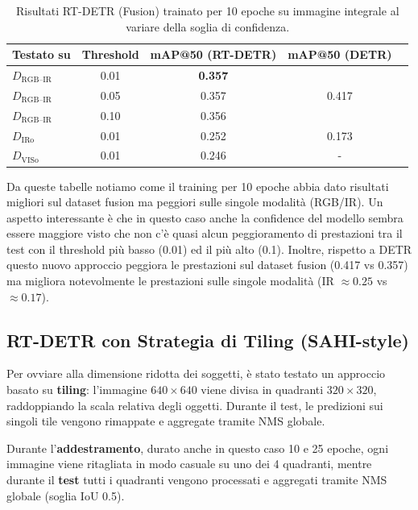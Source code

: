 \documentclass[a4paper,11pt]{article}
\begin{document}
\begin{table}[h]
\centering
\caption{Risultati RT-DETR (Fusion) trainato per 10 epoche su immagine integrale al variare della soglia di confidenza.}
\label{tab:rtdetr_base_10}
\begin{tabular}{lcccc}
\toprule
Testato su & Threshold & mAP@50 (RT-DETR) & mAP@50 (DETR) \\
\midrule
$D_{\text{RGB--IR}}$ & 0.01 & \textbf{0.357} & \multirow{3}{*}{0.417} \\
$D_{\text{RGB--IR}}$ & 0.05 & 0.357 & \\
$D_{\text{RGB--IR}}$ & 0.10 & 0.356 & \\
\midrule
$D_{\text{IRo}}$ & 0.01 & 0.252 & 0.173 \\
$D_{\text{VISo}}$ & 0.01 & 0.246 & - \\
\bottomrule
\end{tabular}
\end{table}

Da queste tabelle notiamo come il training per 10 epoche abbia dato risultati migliori sul dataset fusion ma peggiori sulle singole modalità (RGB/IR). Un aspetto interessante è che in questo caso anche la confidence del modello sembra essere maggiore visto che non c'è quasi alcun peggioramento di prestazioni tra il test con il threshold più basso (0.01) ed il più alto (0.1).
Inoltre, rispetto a DETR questo nuovo approccio peggiora le prestazioni sul dataset fusion (0.417 vs 0.357) ma migliora notevolmente le prestazioni sulle singole modalità (IR $\approx 0.25$ vs $\approx 0.17$).

\newpage

\subsection{RT-DETR con Strategia di Tiling (SAHI-style)}
Per ovviare alla dimensione ridotta dei soggetti, è stato testato un approccio basato su \textbf{tiling}: l'immagine $640 \times 640$ viene divisa in quadranti $320 \times 320$, raddoppiando la scala relativa degli oggetti. Durante il test, le predizioni sui singoli tile vengono rimappate e aggregate tramite NMS globale.

Durante l'\textbf{addestramento}, durato anche in questo caso 10 e 25 epoche, ogni immagine viene ritagliata in modo casuale su uno dei 4 quadranti, mentre durante il \textbf{test} tutti i quadranti vengono processati e aggregati tramite NMS globale (soglia IoU 0.5).
\end{document}
